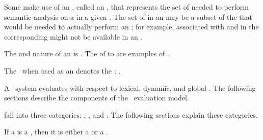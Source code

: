 \endsubsubsection%


Some  make use of an , 
called an ,
that represents the set of  needed to perform
semantic analysis on a  in a given .
The set of  in an 
may be a subset of the  that would be needed to actually 
perform an ; for example,  associated with
  and  in the corresponding
 might not be available in an .

The  and nature of an  is .
The  of  to 
are examples of .

The  \nil\ when used as an 
denotes the ;
\seesection\NullLexicalEnv.

\endsubsubsection%

\endSubsection%


A \clisp\ system evaluates  with respect to lexical,
dynamic, and global .  The following sections
describe the components of the \clisp\ evaluation model.


 fall into three categories:
, , and .
The following sections explain these categories.
                                            

If a  is a ,
then it is either a  or a .


